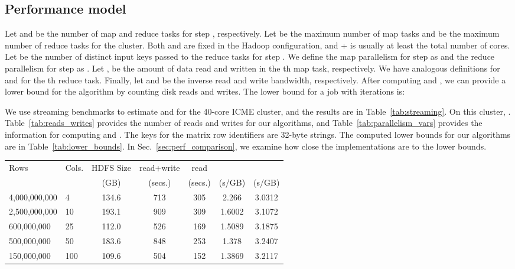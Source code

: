 \documentclass[10pt, conference, compsocconf]{IEEEtran}
\begin{document}
\subsection{Performance model}\label{sec:perf_model}

Let  and  be the number of map and reduce tasks for step , respectively.  Let  be the maximum number of map tasks and  be the maximum number of reduce tasks for the cluster.  Both  and  are fixed in the Hadoop configuration, and  +  is usually at least the total number of cores.  Let  be the number of distinct input keys passed to the reduce tasks for step .  We define the map parallelism for step  as  and the reduce parallelism for step  as .  Let ,  be the amount of data read and written in the th map task, respectively.  
We have analogous definitions for  and  for the th reduce task.  Finally, let  and  be the inverse read and write bandwidth, respectively.  After computing  and , we can provide a lower bound for the algorithm by counting disk reads and writes.  The lower bound for a job with  iterations is:


We use streaming benchmarks to estimate  and  for the 40-core ICME cluster, and the results are in Table~\ref{tab:streaming}.    On this cluster, .  Table~\ref{tab:reads_writes} provides the number of reads and writes for our algorithms, and Table~\ref{tab:parallelism_vars} provides the information for computing  and .  The keys for the matrix row identifiers are 32-byte strings.  The computed lower bounds for our algorithms are in Table~\ref{tab:lower_bounds}.  In Sec.~\ref{sec:perf_comparison}, we examine how close the implementations are to the lower bounds. 

\begin{table*}[tbp]
\vspace{-\baselineskip}
\centering
\caption{Streaming time to read from and write to disk.  Performance is in inverse bandwidth, so larger  and  means slower streaming.  The streaming benchmarks are performed with  map tasks.}
\begin{tabular}{l l c @{\qquad\qquad} c c @{\qquad\qquad} c c}
\toprule
Rows & Cols. & HDFS Size & read+write & read &  &  \\
           &            &    (GB)         &     (secs.)     & (secs.) & (s/GB)    & (s/GB) \\
\midrule
4,000,000,000 & 4     & 134.6 & 713 & 305 & 2.266 & 3.0312 \\
2,500,000,000 & 10   & 193.1 & 909 & 309 & 1.6002 & 3.1072 \\
600,000,000    & 25   & 112.0 & 526 & 169 & 1.5089 & 3.1875 \\
500,000,000    & 50   & 183.6 & 848 & 253 & 1.378 & 3.2407 \\
150,000,000    & 100 & 109.6 & 504 & 152 & 1.3869 & 3.2117 \\
\bottomrule
\end{tabular}
\label{tab:streaming}
\end{table*}
\end{document}
